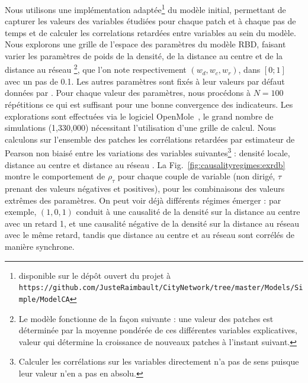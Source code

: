 {Nous utilisons une implémentation adaptée\footnote{disponible sur le dépôt ouvert du projet à\\\texttt{https://github.com/JusteRaimbault/CityNetwork/tree/master/Models/Simple/ModelCA}} du modèle initial, permettant de capturer les valeurs des variables étudiées pour chaque patch et à chaque pas de temps et de calculer les correlations retardées entre variables au sein du modèle. Nous explorons une grille de l'espace des paramètres du modèle RBD, faisant varier les paramètres de poids de la densité, de la distance au centre et de la distance au réseau  \footnote{Le modèle fonctionne de la façon suivante : une valeur des patches est déterminée par la moyenne pondérée de ces différentes variables explicatives, valeur qui détermine la croissance de nouveaux patches à l'instant suivant.}, que l'on note respectivement $(w_{d},w_{c},w_{r})$, dans $\left[0;1\right]$ avec un pas de 0.1. Les autres paramètres sont fixés à leur valeurs par défaut données par \cite{raimbault2014hybrid}. Pour chaque valeur des paramètres, nous procédons à $N=100$ répétitions ce qui est suffisant pour une bonne convergence des indicateurs. Les explorations sont effectuées via le logiciel OpenMole~\cite{reuillon2013openmole}, le grand nombre de simulations (1,330,000) nécessitant l'utilisation d'une grille de calcul. Nous calculons sur l'ensemble des patches les corrélations retardées par estimateur de Pearson non biaisé entre les variations des variables suivantes\footnote{Calculer les corrélations sur les variables directement n'a pas de sens puisque leur valeur n'en a pas en absolu.} : densité locale, distance au centre et distance au réseau  . La Fig.~\ref{fig:causalityregimes:exrdb} montre le comportement de $\rho_{\tau}$ pour chaque couple de variable  (non dirigé, $\tau$ prenant des valeurs négatives et positives), pour les combinaisons des valeurs extrêmes des paramètres. On peut voir déjà différents régimes émerger : par exemple, $(1,0,1)$ conduit à une causalité de la densité sur la distance au centre avec un retard 1, et une causalité négative de la densité sur la distance au réseau avec le même retard, tandis que distance au centre et au réseau sont corrélés de manière synchrone. 
}





